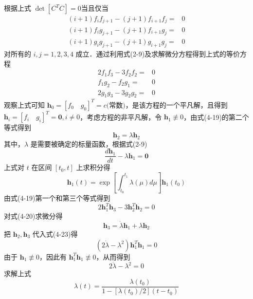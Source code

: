 根据上式 $\det [C^T C] = 0$当且仅当
\begin{equation}
	\begin{split}
		(i+1)f_i f_{j+1} - (j+1) f_{i+1} f_{j} =& 0 \\
		(i+1) f_i g_{j+1} - (j+1) f_{i+1} g_j =& 0  \\
		(i+1) g_i g_{j+1} - (j+1) g_{i+1} g_j =& 0
	\end{split}
\end{equation}
对所有的 $i,j =1,2,3,4$ 成立．通过利用式(2-9)及求解微分方程得到上式的等价方程
\begin{equation}
	\begin{split}
		2f_1 f_3 - 3f_2 f_2 =& 0 \\
		f_1 g_2 - f_2 g_1 =& 0 \\
		2g_1 g_3 - 3 g_2 g_2 =& 0
 	\end{split}
\end{equation}
观察上式可知 $\bm{h}_0 = [f_0 \quad g_0]^T = c\text{(常数)}$，是该方程的一个平凡解，且得到 $\bm{h}_i = [f_i \quad g_i]^T=\bm{0},i \neq 0$，考虑方程的非平凡解，令 $\bm{h}_1 \not \equiv 0$，由式(4-19)的第二个等式得到
\begin{equation}
	\bm{h}_2 = \lambda \bm{h}_2
\end{equation}  
其中，$\lambda$ 是需要被确定的标量函数，根据式(2-9)
\begin{equation}
	\frac{d\bm{h}_1}{dt} - \lambda \bm{h}_1 =\bm{0}
\end{equation}
上式对 $t$ 在区间 $[t_0,t]$ 上求积分得
\begin{equation}
	\bm{h}_1(t) = \exp \left[ \int_{t_0}^{t_1} \lambda (\mu) d \mu \right] \bm{h}_1 (t_0)
\end{equation}
由式(4-19)第一个和第三个等式得到
\begin{equation}
	2\bm{h}_1^T \bm{h}_3 - 3 \bm{h}_2^T \bm{h}_2 = 0
\end{equation}
对式(4-20)求微分得
\begin{equation}
	\bm{h}_3 = \dot{\lambda} \bm{h}_1 + \lambda \bm{h}_2
\end{equation}
把 $\bm{h}_2,\bm{h}_3$ 代入式(4-23)得
\begin{equation}
	(2\dot{\lambda} - \lambda^2) \bm{h}_1^T \bm{h}_1 = 0
\end{equation}
由于 $\bm{h}_1 \not \equiv 0$，因此有 $\bm{h}_1^T \bm{h}_1 \not \equiv 0$，从而得到
\begin{equation}
	2\dot{\lambda} - \lambda^2 =0
\end{equation}
求解上式
\begin{equation}
	\lambda (t) = \frac{\lambda (t_0)}{1-[\lambda (t_0)/2](t-t_0)}
\end{equation}
